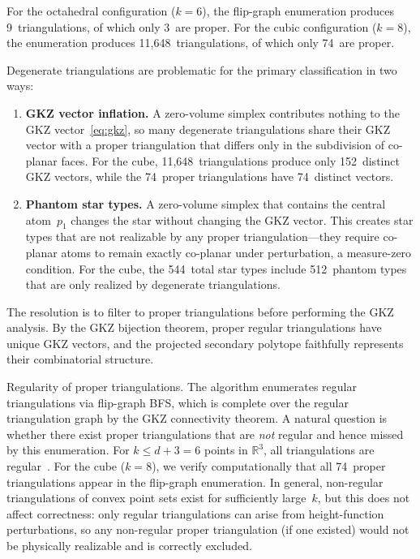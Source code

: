 \documentclass[11pt]{article}
\newcommand{\R}{\mathbb{R}}
\theoremstyle{definition}
\begin{document}
For the octahedral configuration ($k = 6$), the flip-graph enumeration
produces 9~triangulations, of which only 3~are proper.  For the cubic
configuration ($k = 8$), the enumeration produces
11{,}648~triangulations, of which only 74~are proper.

Degenerate triangulations are problematic for the primary classification
in two ways:
\begin{enumerate}
\item \textbf{GKZ vector inflation.}  A zero-volume simplex contributes
  nothing to the GKZ vector~\eqref{eq:gkz}, so many degenerate
  triangulations share their GKZ vector with a proper triangulation that
  differs only in the subdivision of co-planar faces.  For the cube,
  11{,}648~triangulations produce only 152~distinct GKZ vectors, while
  the 74~proper triangulations have 74~distinct vectors.
\item \textbf{Phantom star types.}  A zero-volume simplex that contains
  the central atom~$p_1$ changes the star without changing the GKZ
  vector.  This creates star types that are not realizable by any proper
  triangulation---they require co-planar atoms to remain exactly
  co-planar under perturbation, a measure-zero condition.  For the cube,
  the 544~total star types include 512~phantom types that are only
  realized by degenerate triangulations.
\end{enumerate}

The resolution is to filter to proper triangulations before performing
the GKZ analysis.  By the GKZ bijection theorem, proper regular
triangulations have unique GKZ vectors, and the projected secondary
polytope faithfully represents their combinatorial structure.

\begin{paragraph}{Regularity of proper triangulations.}
The algorithm enumerates regular triangulations via flip-graph BFS,
which is complete over the regular triangulation graph by the GKZ
connectivity theorem.  A natural question is whether there exist proper
triangulations that are \emph{not} regular and hence missed by this
enumeration.  For $k \leq d + 3 = 6$ points in $\R^3$, all
triangulations are regular~\cite{dlrs2010}.  For the cube ($k = 8$), we
verify computationally that all 74~proper triangulations appear in the
flip-graph enumeration.  In general, non-regular triangulations of
convex point sets exist for sufficiently large~$k$, but this does not
affect correctness: only regular triangulations can arise from
height-function perturbations, so any non-regular proper triangulation
(if one existed) would not be physically realizable and is correctly
excluded.
\end{paragraph}
\end{document}
